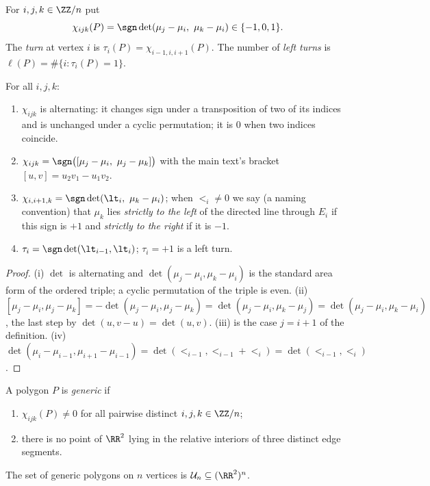 \begin{definition}\label{def:chirotope}\leanok
For $i,j,k\in\ZZ/n$ put
\[
\chi_{ijk}(P)=\sgn\det(\mu_j-\mu_i,\ \mu_k-\mu_i)\in\{-1,0,1\}.
\]
The \emph{turn} at vertex $i$ is $\tau_i(P)=\chi_{i-1,i,i+1}(P)$. The number
of \emph{left turns} is $\ell(P)=\#\{i:\tau_i(P)=1\}$.
\end{definition}

\begin{lemma}\label{lem:chi-basic}\leanok
For all $i,j,k$:
\begin{enumerate}
\item[(i)] $\chi_{ijk}$ is alternating: it changes sign under a transposition
of two of its indices and is unchanged under a cyclic permutation; it is $0$
when two indices coincide.
\item[(ii)] $\chi_{ijk}=\sgn\bigl([\mu_j-\mu_i,\ \mu_j-\mu_k]\bigr)$ with the
main text's bracket $[u,v]=u_2v_1-u_1v_2$.
\item[(iii)] $\chi_{i,i+1,k}=\sgn\det(\lt_i,\ \mu_k-\mu_i)$; when $\lt_i\neq0$
we say (a naming convention) that $\mu_k$ lies \emph{strictly to the left} of
the directed line through $E_i$ if this sign is $+1$ and \emph{strictly to the
right} if it is $-1$.
\item[(iv)] $\tau_i=\sgn\det(\lt_{i-1},\lt_i)$; $\tau_i=+1$ is a left turn.
\end{enumerate}

\end{lemma}
\begin{proof}\leanok
(i) $\det$ is alternating and $\det(\mu_j-\mu_i,\mu_k-\mu_i)$ is the standard
area form of the ordered triple; a cyclic permutation of the triple is even.
(ii) $[\mu_j-\mu_i,\mu_j-\mu_k]=-\det(\mu_j-\mu_i,\mu_j-\mu_k)
=\det(\mu_j-\mu_i,\mu_k-\mu_j)=\det(\mu_j-\mu_i,\mu_k-\mu_i)$, the last step
by $\det(u,v-u)=\det(u,v)$. (iii) is the case $j=i+1$ of the definition.
(iv) $\det(\mu_i-\mu_{i-1},\mu_{i+1}-\mu_{i-1})=\det(\lt_{i-1},\lt_{i-1}+\lt_i)
=\det(\lt_{i-1},\lt_i)$.
\end{proof}

\begin{definition}\label{def:generic}\leanok
A polygon $P$ is \emph{generic} if
\begin{enumerate}
\item[(G1)] $\chi_{ijk}(P)\neq0$ for all pairwise distinct $i,j,k\in\ZZ/n$;
\item[(G2)] there is no point of $\RR^2$ lying in the relative interiors of
three distinct edge segments.
\end{enumerate}
The set of generic polygons on $n$ vertices is $\mathcal U_n\subseteq(\RR^2)^n$.
\end{definition}

